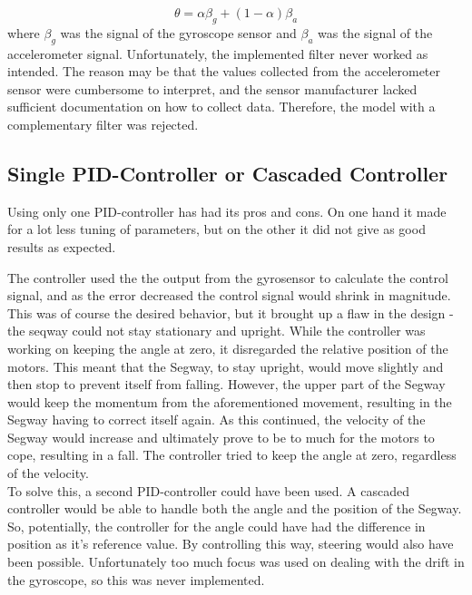 \begin{displaymath}
\theta = \alpha \beta_{g} + (1-\alpha)\beta_{a}
\end{displaymath}
where $\beta_g$ was the signal of the gyroscope sensor and $\beta_a$ was the signal of the accelerometer signal. Unfortunately, the implemented filter never worked as intended. The reason may be that the values collected from the accelerometer sensor were cumbersome to interpret, and the sensor manufacturer lacked sufficient documentation on how to collect data. Therefore, the model with a complementary filter was rejected.

\subsection{Single PID-Controller or Cascaded Controller}
Using only one PID-controller has had its pros and cons. On one hand it made for a lot less tuning of parameters, but on the other it did not give as good results as expected.

The controller used the the output from the gyrosensor to calculate the control signal, and as the error decreased the control signal would shrink in magnitude. This was of course the desired behavior, but it brought up a flaw in the design - the seqway could not stay stationary and upright. While the controller was working on keeping the angle at zero, it disregarded the relative position of the motors. This meant that the Segway, to stay upright, would move slightly and then stop to prevent itself from falling. However, the upper part of the Segway would keep the momentum from the aforementioned movement, resulting in the Segway having to correct itself again. As this continued, the velocity of the Segway would increase and ultimately prove to be to much for the motors to cope, resulting in a fall. The controller tried to keep the angle at zero, regardless of the velocity.
\\[3ex]
To solve this, a second PID-controller could have been used. A cascaded controller would be able to handle both the angle and the position of the Segway. So, potentially, the controller for the angle could have had the difference in position as it's reference value. By controlling this way, steering would also have been possible. Unfortunately too much focus was used on dealing with the drift in the gyroscope, so this was never implemented.

\newpage



